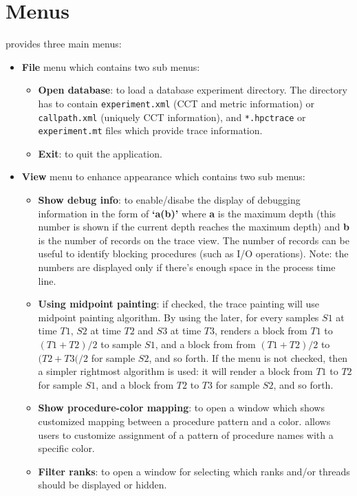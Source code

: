 \documentclass[english]{article}
\begin{document}
\section{Menus}
 provides three main menus:
\begin{itemize}
 \item \textbf{File} menu which contains two sub menus:
 \begin{itemize}
   \item \textbf{Open database}: to load a database experiment directory. The directory has to contain \texttt{experiment.xml} (CCT and metric information) or \texttt{callpath.xml} (uniquely CCT information), and \texttt{*.hpctrace} or \texttt{experiment.mt} files which provide trace information.
   \item \textbf{Exit}: to quit the application.
 \end{itemize}
 \item \textbf{View} menu to enhance appearance which contains two sub menus:
 \begin{itemize}
   \item \textbf{Show debug info}: to enable/disabe the display of debugging information in the form of \textbf{`a(b)'} where \textbf{a} is the maximum depth (this number is shown if the current depth reaches the maximum depth) and \textbf{b} is the number of records on the trace view. 
The number of records can be useful to identify blocking procedures (such as I/O operations). Note: the numbers are displayed only if there's enough space in the process time line.
   \item \textbf{Using midpoint painting}: if checked, the trace painting will use {midpoint} painting algorithm. By using the later, for every samples $S1$ at time $T1$, $S2$ at time $T2$ and $S3$ at time $T3$,  renders a block from $T1$ to $(T1+T2)/2$ to sample $S1$, and a block from from  $(T1+T2)/2$ to  $(T2+T3(/2$ for sample $S2$, and so forth. 
If the menu is not checked, then a simpler {rightmost} algorithm is used: it will render a block from  $T1$ to $T2$ for sample $S1$, and a block from $T2$ to  $T3$ for sample $S2$, and so forth.
   \item \textbf{Show procedure-color mapping}: to open a window which shows customized mapping between a procedure pattern and a color.  allows users to customize assignment of a pattern of procedure names with a specific color.
   \item \textbf{Filter ranks}: to open a window for selecting which ranks and/or threads should be displayed or hidden. 

\end{itemize}
\end{itemize}
\end{document}
